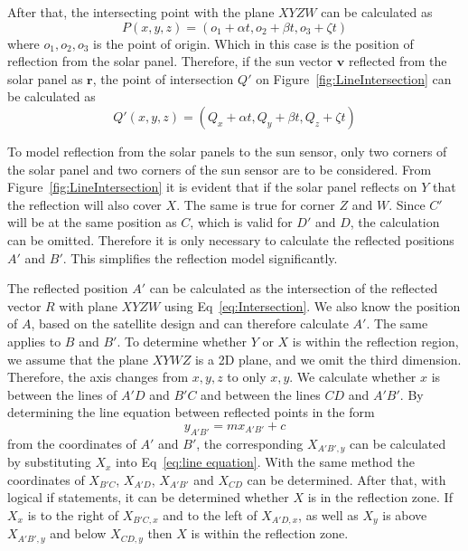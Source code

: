\documentclass[letterpaper, 10 pt, conference]{ieeeconf}  %
\begin{document}
After that, the intersecting point with the plane $XYZW$ can be calculated as
\begin{equation}
P(x, y, z) = (o_1 + \alpha t, o_2 + \beta t, o_3 + \zeta t)
\label{eq:Intersection}
\end{equation}
where $o_1, o_2, o_3$ is the point of origin. Which in this case is the position of reflection from the solar panel. Therefore, if the sun vector $\mathbf{v}$ reflected from the solar panel as $\mathbf{r}$, the point of intersection $Q'$ on Figure~\ref{fig:LineIntersection} can be calculated as
\begin{equation}
Q'(x, y, z) = (Q_x + \alpha t, Q_y + \beta t, Q_z + \zeta t)
\label{eq:SpecificIntersection}
\end{equation}

To model reflection from the solar panels to the sun sensor, only two corners of the solar panel and two corners of the sun sensor are to be considered. From Figure~\ref{fig:LineIntersection} it is evident that if the solar panel reflects on $Y$ that the reflection will also cover $X$. The same is true for corner $Z$ and $W$. Since $C'$ will be at the same position as $C$, which is valid for $D'$ and $D$, the calculation can be omitted. Therefore it is only necessary to calculate the reflected positions $A'$ and $B'$. This simplifies the reflection model significantly.

The reflected position $A'$ can be calculated as the intersection of the reflected vector $R$ with plane $XYZW$ using Eq~\ref{eq:Intersection}. We also know the position of $A$, based on the satellite design and can therefore calculate $A'$. The same applies to $B$ and $B'$. To determine whether $Y$ or $X$ is within the reflection region, we assume that the plane $XYWZ$ is a 2D plane, and we omit the third dimension. Therefore, the axis changes from $x, y, z$ to only $x, y$. We calculate whether $x$ is between the lines of $A'D$ and $B'C$ and between the lines $CD$ and $A'B'$. By determining the line equation between reflected points in the form 
\begin{equation}
y_{A'B'} = mx_{A'B'} + c
\label{eq:line equation}
\end{equation}
from the coordinates of $A'$ and $B'$, the corresponding $X_{A'B',y}$ can be calculated by substituting $X_x$ into Eq~\ref{eq:line equation}. With the same method the coordinates of $X_{B'C}$, $X_{A'D}$, $X_{A'B'}$ and $X_{CD}$ can be determined. After that, with logical if statements, it can be determined whether $X$ is in the reflection zone. If $X_x$ is to the right of $X_{B'C,x}$ and to the left of $X_{A'D,x}$, as well as $X_y$ is above $X_{A'B',y}$ and below $X_{CD,y}$ then $X$ is within the reflection zone. 
\end{document}
